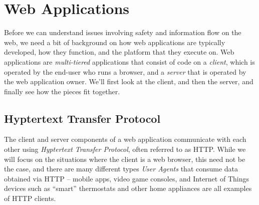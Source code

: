 \documentclass[11pt,twoside]{scrartcl}
\begin{document}
\section{Web Applications}

Before we can understand issues involving safety and information flow on the web, we need a bit of background on how web applications are typically developed, how they function, and the platform that they execute on. Web applications are \emph{multi-tiered} applications that consist of code on a \emph{client}, which is operated by the end-user who runs a browser, and a \emph{server} that is operated by the web application owner. We'll first look at the client, and then the server, and finally see how the pieces fit together.

\subsection{Hyptertext Transfer Protocol}

The client and server components of a web application communicate with each other using \emph{Hyptertext Transfer Protocol}, often referred to as HTTP.
While we will focus on the situations where the client is a web browser, this need not be the case, and there are many different types \emph{User Agents} that consume data obtained via HTTP -- mobile apps, video game consoles, and Internet of Things devices such as ``smart'' thermostats and other home appliances are all examples of HTTP clients.
\end{document}
